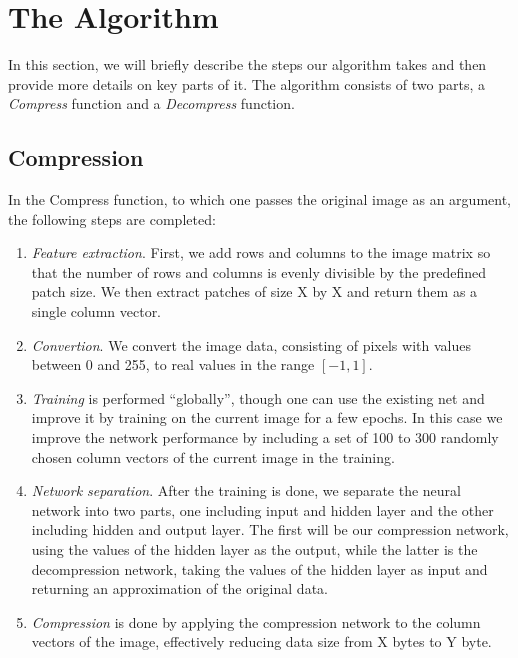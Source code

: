 \section{The Algorithm}
\label{sec:algorithm}

In this section, we will briefly describe the steps our algorithm takes and then provide more details on key parts of it. The algorithm consists of two parts, a \emph{Compress} function and a \emph{Decompress} function. 

\subsection{Compression} \label{sec:compress}
In the Compress function, to which one passes the original image as an argument, the following steps are completed:
\begin{enumerate}
\item \emph{Feature extraction}. First, we add rows and columns to the image matrix so that the number of rows and columns is evenly divisible by the predefined patch size. We then extract patches of size {\color{red}X by X} and return them as a single column vector.

\item \emph{Convertion}. We convert the image data, consisting of pixels with values between 0 and 255, to real values in the range \([-1, 1]\). 

\item \emph{Training} is performed ``globally'', though one can use the existing net and improve it by training on the current image for a few epochs. In this case we improve the network performance by including a set of 100 to 300 randomly chosen column vectors of the current image in the training.

\item \emph{Network separation}. After the training is done, we separate the neural network into two parts, one including input and hidden layer and the other including hidden and output layer. The first will be our compression network, using the values of the hidden layer as the output, while the latter is the decompression network, taking the values of the hidden layer as input and returning an approximation of the original data.

\item \emph{Compression} is done by applying the compression network to the column vectors of the image, effectively reducing data size from {\color{red} X bytes to Y byte}.


\end{enumerate}
